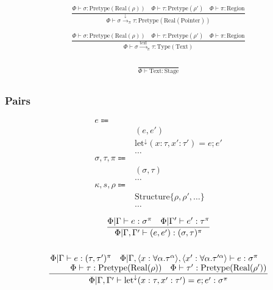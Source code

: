 \documentclass {article}
\begin{document}
\begin{gather*}
\frac
{\Phi \vdash \sigma : \text{Pretype} (\text{Real} (\rho)) \quad \Phi \vdash \tau : \text{Pretype} (\rho') \quad \Phi \vdash \pi : \text{Region}}
{\Phi \vdash \sigma \xrightarrow{\downarrow}_\pi \tau : \text{Pretype} (\text{Real} (\text{Pointer}))} \\
\\
\frac
{\Phi \vdash \sigma : \text{Pretype} (\text{Real} (\rho)) \quad \Phi \vdash \tau : \text{Pretype} (\rho') \quad \Phi \vdash \pi : \text{Region}}
{\Phi \vdash \sigma \xrightarrow{\text{text}}_\pi \tau : \text{Type} (\text{Text})} \\
\end{gather*}


\begin{gather*}
\frac
{}
{\Phi \vdash \text{Text} : \text{Stage}} \\
\end{gather*}

\subsubsection{Pairs}
\begin{align*}
e \Coloneqq & \\
& (e, e') \tag{Pair Introduction} \\
& \text{let}^\downarrow (x : \tau, x' : \tau') = e; e' \tag{Pair Elimination} \\
& \dots \\
\sigma, \tau, \pi \Coloneqq & \\
& (\sigma, \tau) \tag{Runtime Pair} \\
& \dots \\
\kappa, s, \rho \Coloneqq & \\
& \text{Structure} \{ \rho, \rho', \dots \} \tag{Structure Representation} \\
& \dots
\end{align*}

\begin{gather*}
\frac
{\Phi | \Gamma \vdash e : \sigma^\pi \quad \Phi | \Gamma' \vdash e' : \tau^\pi}
{\Phi | \Gamma, \Gamma' \vdash (e, e') : (\sigma, \tau)^\pi } \\
\\
\frac
{\splitfrac{\Phi | \Gamma \vdash e : (\tau, \tau')^\pi \quad \Phi | \Gamma , \langle x : \forall \alpha. \tau^\alpha \rangle, \langle x' : \forall \alpha. \tau'^\alpha \rangle \vdash e : \sigma^\pi}
{\Phi \vdash \tau : \text{Pretype}(\text{Real}(\rho)) \quad \Phi \vdash \tau' : \text{Pretype}(\text{Real}(\rho')) }}
{\Phi | \Gamma, \Gamma' \vdash \text{let}^\downarrow (x : \tau, x' : \tau') = e; e' : \sigma^\pi}
\end{gather*}
\end{document}
